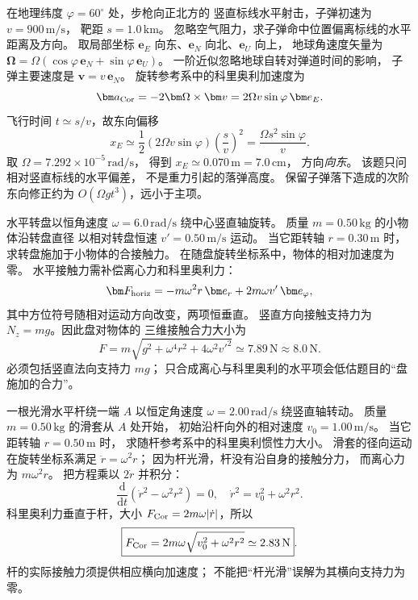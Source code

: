 在地理纬度 $\varphi=60^\circ$ 处，步枪向正北方的
竖直标线水平射击，子弹初速为 $v=900\,\mathrm{m/s}$，
靶距 $s=1.0\,\mathrm{km}$。
忽略空气阻力，求子弹命中位置偏离标线的水平距离及方向。
\exsolution
取局部坐标 $\bm e_E$ 向东、$\bm e_N$ 向北、$\bm e_U$ 向上，
地球角速度矢量为
$\bm\Omega=\Omega(\cos\varphi\,\bm e_N+
\sin\varphi\,\bm e_U)$。
一阶近似忽略地球自转对弹道时间的影响，
子弹主要速度是 $\bm v=v\,\bm e_N$。
旋转参考系中的科里奥利加速度为
\[
\bm a_{\rm Cor}=-2\bm\Omega\times\bm v
=2\Omega v\sin\varphi\,\bm e_E.
\]
飞行时间 $t\simeq s/v$，故东向偏移
\[
\boxed{x_E\simeq\frac12(2\Omega v\sin\varphi)
\left(\frac sv\right)^2
=\frac{\Omega s^2\sin\varphi}{v}}.
\]
取 $\Omega=7.292\times10^{-5}\,\mathrm{rad/s}$，
得到 $\boxed{x_E\simeq0.070\,\mathrm m=7.0\,\mathrm{cm}}$，
方向\emph{向东}。
\excheck 该题只问相对竖直标线的水平偏差，
不是重力引起的落弹高度。
保留子弹落下造成的次阶东向修正约为
$O(\Omega gt^3)$，远小于主项。

水平转盘以恒角速度 $\omega=6.0\,\mathrm{rad/s}$
绕中心竖直轴旋转。
质量 $m=0.50\,\mathrm{kg}$ 的小物体沿转盘直径
以相对转盘恒速 $v'=0.50\,\mathrm{m/s}$ 运动。
当它距转轴 $r=0.30\,\mathrm m$ 时，
求转盘施加于小物体的合接触力。
\exsolution
在随盘旋转坐标系中，物体的相对加速度为零。
水平接触力需补偿离心力和科里奥利力：
\[
\bm F_{\rm horiz}
=-m\omega^2r\,\bm e_r+
2m\omega v'\,\bm e_\varphi ,
\]
其中方位符号随相对运动方向改变，两项恒垂直。
竖直方向接触支持力为 $N_z=mg$。因此盘对物体的
三维接触合力大小为
\[
\boxed{F=m\sqrt{g^2+\omega^4r^2+4\omega^2{v'}^2}}
\simeq7.89\,\mathrm N\approx8.0\,\mathrm N.
\]
\excheck 必须包括竖直法向支持力 $mg$；
只合成离心与科里奥利的水平项会低估题目的“盘施加的合力”。

一根光滑水平杆绕一端 $A$ 以恒定角速度
$\omega=2.00\,\mathrm{rad/s}$ 绕竖直轴转动。
质量 $m=0.50\,\mathrm{kg}$ 的滑套从 $A$ 处开始，
初始沿杆向外的相对速度 $v_0=1.00\,\mathrm{m/s}$。
当它距转轴 $r=0.50\,\mathrm m$ 时，
求随杆参考系中的科里奥利惯性力大小。
\exsolution
滑套的径向运动在旋转坐标系满足
$\ddot r=\omega^2r$；
因为杆光滑，杆没有沿自身的接触分力，
而离心力为 $m\omega^2r$。
把方程乘以 $2\dot r$ 并积分：
\[
\frac{\mathrm d}{\mathrm dt}
(\dot r^2-\omega^2r^2)=0,
\quad
\dot r^2=v_0^2+\omega^2r^2.
\]
科里奥利力垂直于杆，大小
$F_{\rm Cor}=2m\omega|\dot r|$，所以
\[
\boxed{F_{\rm Cor}=
2m\omega\sqrt{v_0^2+\omega^2r^2}
\simeq2.83\,\mathrm N}.
\]
\excheck 杆的实际接触力须提供相应横向加速度；
不能把“杆光滑”误解为其横向支持力为零。

